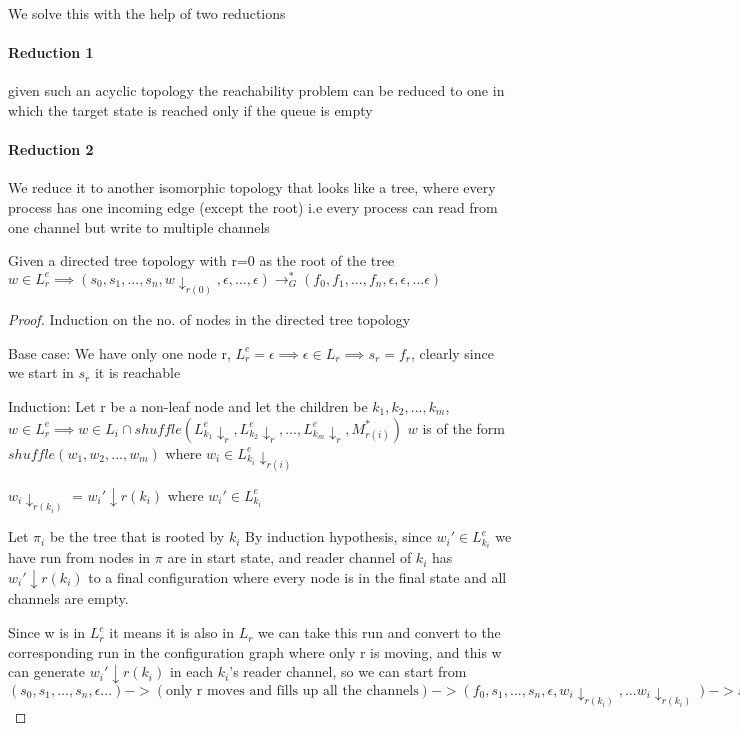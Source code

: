 \documentclass[a4paper,UKenglish,cleveref, autoref, thm-restate]{lipics-v2019}
\begin{document}
We solve this with the help of two reductions

\paragraph*{Reduction 1}

given such an acyclic topology the reachability problem can be reduced to one in which the target state is reached only if the queue is empty \cite{CQS}

\paragraph*{Reduction 2}
We reduce it to another isomorphic topology that looks like a tree, where every process has one incoming edge (except the root) i.e every process can read from one channel but write to multiple channels \cite{CQS}




    

\begin{lemma}\label{testenv-lemma}
Given a directed tree topology with r=0 as the root of the tree
$w \in L_r^e \implies (s_0, s_1, ...,s_n, w \downarrow_{r(0)}, \epsilon, ...,\epsilon) \rightarrow_G^* (f_0, f_1, ..., f_n, \epsilon, \epsilon, ... \epsilon)$
\end{lemma}
   
   
\begin{proof}
Induction on the no. of nodes in the directed tree topology

Base case: We have only one node r,  $L_r^e = {\epsilon} \implies \epsilon \in L_r \implies s_r = f_r$, clearly since we start in $s_r$ it is reachable

Induction: 
Let r be a non-leaf node and let the children be $k_1, k_2, ..., k_m$,  
$w \in L_r^e \implies w \in L_i \cap shuffle(L_{k_1}^e\!\!\!\downarrow_{r}, L_{k_2}^e\!\!\!\downarrow_{r}, ..., L_{k_m}^e\!\!\!\downarrow_{r}, M_{r(i)}^*)$
$w$ is of the form $shuffle(w_1, w_2, ..., w_m)$ where $w_i \in L_{k_i}^e\!\!\!\downarrow_{r(i)}$

$w_i\downarrow_{r(k_i)}$ = $w_i'\downarrow{r(k_i)}$ where $w_i' \in L_{k_i}^e$

Let $\pi_i$ be the tree that is rooted by $k_i$
By induction hypothesis, since $w_i' \in L_{k_i}^e$ we have run from nodes in $\pi$ are in start state, and reader channel of $k_i$ has $w_i'\downarrow{r(k_i)}$ 
to a final configuration where every node is in the final state and all channels are empty.

Since w is in $L_r^e$ it means it is also in $L_r$ we can take this run and convert to the corresponding run in the configuration graph where only r is moving, 
and this w can generate $w_i'\downarrow{r(k_i)}$ in each $k_i$'s reader channel, so we can start from $(s_0, s_1,...,s_n, \epsilon ...) -> (\text{only r moves and fills up all the channels}) -> (f_0, s_1, ..., s_n,\epsilon, w_i\downarrow_{r(k_i)}, ... w_i\downarrow_{r(k_i)} ) -> stitch the k_i run one after the other$ 

    
   \end{proof}
    
\end{document}
